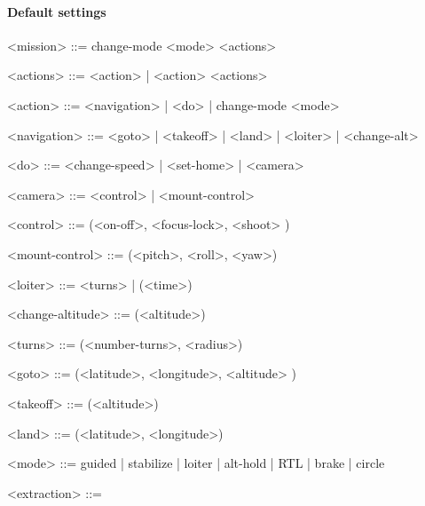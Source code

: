 \documentclass{article}
\begin{document}
	\paragraph{Default settings}
	\begin{grammar}
		
		<mission> ::= change-mode <mode> <actions>
		
		<actions> ::= <action> | <action> <actions>
		
		<action> ::= <navigation> | <do> | change-mode <mode>
		
		<navigation> ::= <goto> | <takeoff> | <land> | <loiter> | <change-alt>
		
		<do> ::= <change-speed> | <set-home> | <camera> 
		
		<camera> ::= <control> | <mount-control> 
		
		<control> ::= (<on-off>, <focus-lock>, <shoot> )
		
		<mount-control> ::= (<pitch>, <roll>, <yaw>)
		
		<loiter> ::= <turns> | (<time>)
		
		<change-altitude> ::= (<altitude>)
		
		<turns> ::= (<number-turns>, <radius>)
		
		<goto> ::= (<latitude>, <longitude>, <altitude> ) 
		
		<takeoff> ::= (<altitude>)
		
		<land> ::= (<latitude>, <longitude>)
		
		<mode> ::= guided | stabilize | loiter | alt-hold | RTL | brake | circle
		
		
		
		
		
		<extraction> ::= 
		
	\end{grammar}
\end{document}
